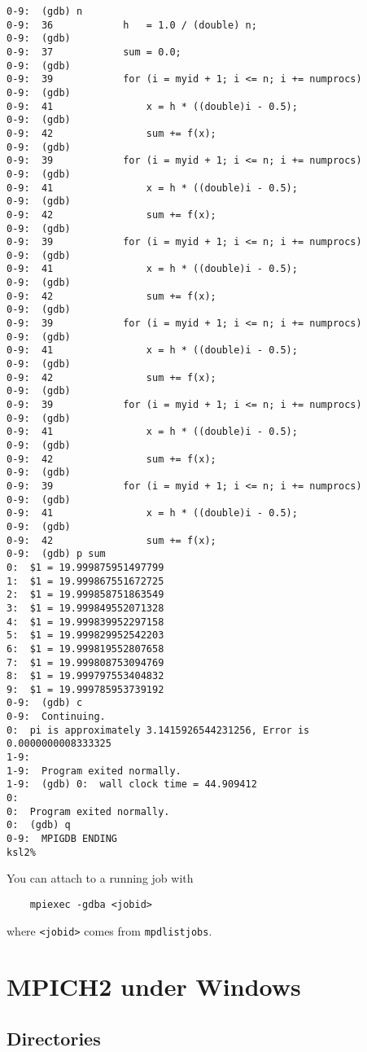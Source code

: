 \documentclass[dvipdfm,11pt]{article}
\begin{document}
\begin{small}
\begin{verbatim}
0-9:  (gdb) n
0-9:  36            h   = 1.0 / (double) n;
0-9:  (gdb) 
0-9:  37            sum = 0.0;
0-9:  (gdb) 
0-9:  39            for (i = myid + 1; i <= n; i += numprocs)
0-9:  (gdb) 
0-9:  41                x = h * ((double)i - 0.5);
0-9:  (gdb) 
0-9:  42                sum += f(x);
0-9:  (gdb) 
0-9:  39            for (i = myid + 1; i <= n; i += numprocs)
0-9:  (gdb) 
0-9:  41                x = h * ((double)i - 0.5);
0-9:  (gdb) 
0-9:  42                sum += f(x);
0-9:  (gdb) 
0-9:  39            for (i = myid + 1; i <= n; i += numprocs)
0-9:  (gdb) 
0-9:  41                x = h * ((double)i - 0.5);
0-9:  (gdb) 
0-9:  42                sum += f(x);
0-9:  (gdb) 
0-9:  39            for (i = myid + 1; i <= n; i += numprocs)
0-9:  (gdb) 
0-9:  41                x = h * ((double)i - 0.5);
0-9:  (gdb) 
0-9:  42                sum += f(x);
0-9:  (gdb) 
0-9:  39            for (i = myid + 1; i <= n; i += numprocs)
0-9:  (gdb) 
0-9:  41                x = h * ((double)i - 0.5);
0-9:  (gdb) 
0-9:  42                sum += f(x);
0-9:  (gdb) 
0-9:  39            for (i = myid + 1; i <= n; i += numprocs)
0-9:  (gdb) 
0-9:  41                x = h * ((double)i - 0.5);
0-9:  (gdb) 
0-9:  42                sum += f(x);
0-9:  (gdb) p sum
0:  $1 = 19.999875951497799
1:  $1 = 19.999867551672725
2:  $1 = 19.999858751863549
3:  $1 = 19.999849552071328
4:  $1 = 19.999839952297158
5:  $1 = 19.999829952542203
6:  $1 = 19.999819552807658
7:  $1 = 19.999808753094769
8:  $1 = 19.999797553404832
9:  $1 = 19.999785953739192
0-9:  (gdb) c
0-9:  Continuing.
0:  pi is approximately 3.1415926544231256, Error is 0.0000000008333325
1-9:  
1-9:  Program exited normally.
1-9:  (gdb) 0:  wall clock time = 44.909412
0:  
0:  Program exited normally.
0:  (gdb) q
0-9:  MPIGDB ENDING
ksl2% 
\end{verbatim}
\end{small}
You can attach to a running job with
\begin{verbatim}
    mpiexec -gdba <jobid>
\end{verbatim}
where \texttt{<jobid>} comes from \texttt{mpdlistjobs}.

\section{MPICH2 under Windows}
\label{sec:windows}

\subsection{Directories}
\label{sec:windir}
\end{document}
